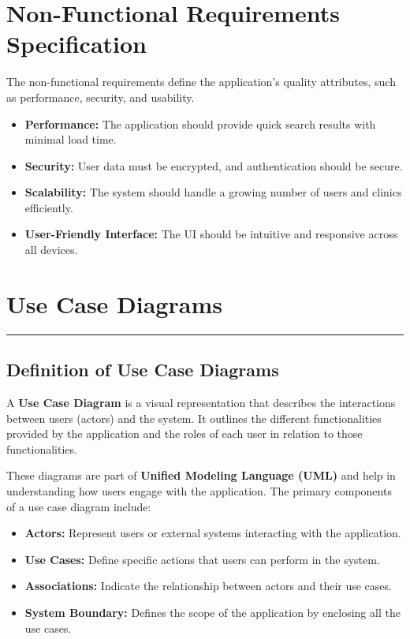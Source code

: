 \documentclass[12pt]{report}
\begin{document}
\section{\textbf{Non-Functional Requirements Specification}}

\noindent The non-functional requirements define the application's quality attributes, such as performance, security, and usability.

\begin{itemize}
	\item \textbf{Performance:} The application should provide quick search results with minimal load time.
	\item \textbf{Security:} User data must be encrypted, and authentication should be secure.
	\item \textbf{Scalability:} The system should handle a growing number of users and clinics efficiently.
	\item \textbf{User-Friendly Interface:} The UI should be intuitive and responsive across all devices.
\end{itemize}


\section{\textbf{Use Case Diagrams}}
\rule{0.45\linewidth}{0.7pt}
\subsection{\textbf{Definition of Use Case Diagrams}}


\noindent A \textbf{Use Case Diagram} is a visual representation that describes the interactions between users (actors) and the system. It outlines the different functionalities provided by the application and the roles of each user in relation to those functionalities.

\noindent These diagrams are part of \textbf{Unified Modeling Language (UML)} and help in understanding how users engage with the application. The primary components of a use case diagram include:

\begin{itemize}
	\item \textbf{Actors:} Represent users or external systems interacting with the application.
	\item \textbf{Use Cases:} Define specific actions that users can perform in the system.
	\item \textbf{Associations:} Indicate the relationship between actors and their use cases.
	\item \textbf{System Boundary:} Defines the scope of the application by enclosing all the use cases.
\end{itemize}
\end{document}
